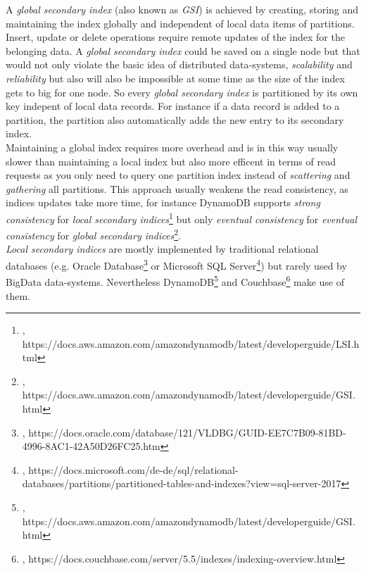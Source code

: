 {A \textit{global secondary index} (also known as \textit{GSI}) is achieved by creating, storing and maintaining the index globally and independent of local data items of partitions. Insert, update or delete operations require remote updates of the index for the belonging data. A \textit{global secondary index} could be saved on a single node but that would not only violate the basic idea of distributed data-systems, \textit{scalability} and \textit{reliability} but also will also be impossible at some time as the size of the index gets to big for one node. So every \textit{global secondary index} is partitioned by its own key indepent of local data records. For instance if a data record is added to a partition, the partition also automatically adds the new entry to its secondary index.\\ 
Maintaining a global index requires more overhead and is in this way usually slower than maintaining a local index but also more efficent in terms of read requests as you only need to query one partition index instead of \textit{scattering} and \textit{gathering} all partitions. This approach usually weakens the read consistency, as indices updates take more time, for instance DynamoDB supports \textit{strong consistency} for \textit{local secondary indices}\footnote{\cite{DYNDBSIL}, https://docs.aws.amazon.com/amazondynamodb/latest/developerguide/LSI.html} but only \textit{eventual consistency} for \textit{eventual consistency} for \textit{global secondary indices}\footnote{\cite{DYNDBGIL}, https://docs.aws.amazon.com/amazondynamodb/latest/developerguide/GSI.html}.\\
\textit{Local secondary indices} are mostly implemented by traditional relational databases (e.g. Oracle Database\footnote{\cite{ORCLGSI}, https://docs.oracle.com/database/121/VLDBG/GUID-EE7C7B09-81BD-4996-8AC1-42A50D26FC25.htm} or Microsoft SQL Server\footnote{\cite{MSSQLGSI}, https://docs.microsoft.com/de-de/sql/relational-databases/partitions/partitioned-tables-and-indexes?view=sql-server-2017}) but rarely used by BigData data-systems. Nevertheless DynamoDB\footnote{\cite{DYNDBGIL}, https://docs.aws.amazon.com/amazondynamodb/latest/developerguide/GSI.html} and Couchbase\footnote{\cite{CBGSI}, https://docs.couchbase.com/server/5.5/indexes/indexing-overview.html} make use of them.\\

}
